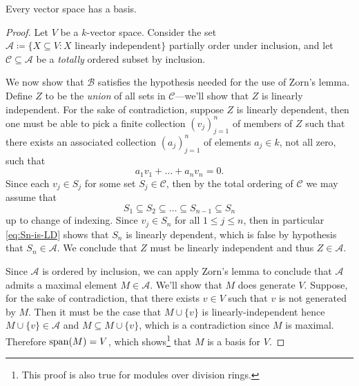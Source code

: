\begin{theorem}
    Every vector space has a basis.
\end{theorem}

\begin{proof}
    Let \(V\) be a \(k\)-vector space. Consider the set
    \(\mathcal A \coloneq \{X \subseteq V \colon X \text{ linearly independent}\}\)
    partially order under inclusion, and let \(\mathcal C \subseteq \mathcal A\) be
    a \emph{totally} ordered subset by inclusion.

    We now show that \(\mathcal B\) satisfies the hypothesis needed for the use of
    Zorn's lemma. Define \(Z\) to be the \emph{union} of all sets in
    \(\mathcal C\)---we'll show that \(Z\) is linearly independent. For the sake of
    contradiction, suppose \(Z\) is linearly dependent, then one must be able to
    pick a finite collection \((v_j)_{j=1}^n\) of members of \(Z\) such that there
    exists an associated collection \((a_j)_{j=1}^n\) of elements \(a_j \in k\), not
    all zero, such that
    \begin{equation}\label{eq:Sn-is-LD}
        a_1 v_1 + \dots + a_n v_n = 0.
    \end{equation}
    Since each \(v_j \in S_j\) for some set \(S_j \in \mathcal{C}\), then by the
    total ordering of \(\mathcal{C}\) we may assume that
    \[
        S_1 \subseteq S_2 \subseteq \dots \subseteq S_{n-1} \subseteq S_n
    \]
    up to change of indexing. Since \(v_j \in S_n\) for all \(1 \leq j \leq n\),
    then in particular \cref{eq:Sn-is-LD} shows that \(S_n\) is linearly dependent,
    which is false by hypothesis that \(S_n \in \mathcal{A}\). We conclude that
    \(Z\) must be linearly independent and thus \(Z \in \mathcal{A}\).

    Since \(\mathcal{A}\) is ordered by inclusion, we can apply Zorn's lemma to
    conclude that \(\mathcal{A}\) admits a maximal element \(M \in
    \mathcal{A}\). We'll show that \(M\) does generate \(V\). Suppose, for the sake
    of contradiction, that there exists \(v \in V\) such that \(v\) is not generated
    by \(M\). Then it must be the case that \(M \cup \{v\}\) is linearly-independent
    hence \(M \cup \{v\} \in \mathcal{A}\) and \(M \subseteq M \cup \{v\}\), which
    is a contradiction since \(M\) is maximal. Therefore \(\operatorname{span}(M) = V\), which
    shows\footnote{This proof is also true for
        modules over division rings.} that \(M\) is a basis for \(V\).
\end{proof}

